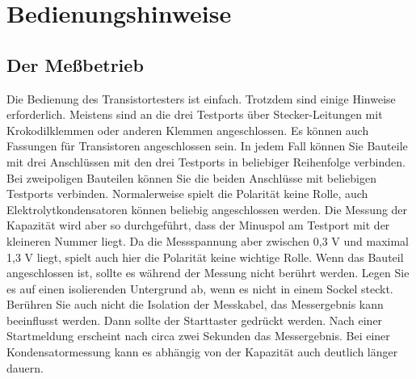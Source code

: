 \chapter{Bedienungshinweise}
\label{sec:manual}
\section{Der Meßbetrieb}
Die Bedienung des Transistortesters ist einfach.
Trotzdem sind einige Hinweise erforderlich.
Meistens sind an die drei Testports über Stecker-Leitungen mit Krokodilklemmen oder anderen Klemmen angeschlossen.
Es können auch Fassungen für Transistoren angeschlossen sein.
In jedem Fall können Sie Bauteile mit drei Anschlüssen mit den drei Testports in beliebiger Reihenfolge verbinden.
Bei zweipoligen Bauteilen können Sie die beiden Anschlüsse mit beliebigen Testports verbinden.
Normalerweise spielt die Polarität keine Rolle, auch Elektrolytkondensatoren können beliebig angeschlossen werden.
Die Messung der Kapazität wird aber so durchgeführt, dass der Minuspol am Testport mit der kleineren Nummer liegt.
Da die Messspannung aber zwischen 0,3 V und maximal 1,3 V liegt, spielt auch hier die Polarität keine wichtige Rolle.
Wenn das Bauteil angeschlossen ist, sollte es während der Messung nicht berührt werden. Legen Sie es auf einen
isolierenden Untergrund ab, wenn es nicht in einem Sockel steckt. Berühren Sie auch nicht die Isolation der Messkabel,
das Messergebnis kann beeinflusst werden.
Dann sollte der Starttaster gedrückt werden.
Nach einer Startmeldung erscheint nach circa zwei Sekunden das Messergebnis. Bei einer Kondensatormessung kann es
abhängig von der Kapazität auch deutlich länger dauern.


